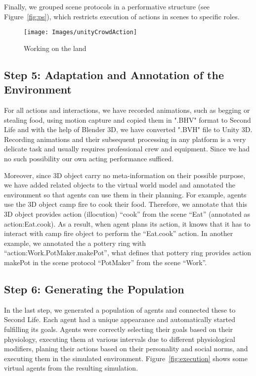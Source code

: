 \documentclass[graybox]{svmult}
\begin{document}
Finally, we grouped scene protocols in a performative structure (see Figure~\ref{fig:ps}), which restricts execution of actions in scenes to specific roles.

\begin{figure}[!ht]
    \centering
    \texttt{[image: Images/unityCrowdAction]}
    \caption{Working on the land}
    \label{fig:praying}
\end{figure}%

\subsection{Step 5: Adaptation and Annotation of the Environment}

For all actions and interactions, we have recorded animations, such as begging or stealing food, using motion capture and copied them in ".BHV" format to Second Life and with the help of Blender 3D, we have converted ".BVH" file to Unity 3D. Recording animations and their subsequent processing in any platform is a very delicate task and usually requires professional crew and equipment. Since we had no such possibility our own acting performance sufficed. 

Moreover, since 3D object carry no meta-information on their possible purpose, we have added related objects to the virtual world model and annotated the environment so that agents can use them in their planning. For example, agents use the 3D object camp fire to cook their food. Therefore, we annotate that this 3D object provides action (illocution) ``cook'' from the scene ``Eat'' (annotated as action:Eat.cook). As a result, when agent plans its action, it knows that it has to interact with camp fire object to perform the ``Eat.cook'' action. In another example, we annotated the a pottery ring with ``action:Work.PotMaker.makePot'', what defines that pottery ring provides action makePot in the scene protocol ``PotMaker'' from the scene ``Work''.


\subsection{Step 6: Generating the Population}

In the last step, we generated a population of agents and connected these to Second Life. Each agent had a unique appearance and automatically started fulfilling its goals. Agents were correctly selecting their goals based on their physiology, executing them at various intervals due to different physiological modifiers, planing their actions based on their personality and social norms, and executing them in the simulated environment. Figure~\ref{fig:execution} shows some virtual agents from the resulting simulation. 
\end{document}
